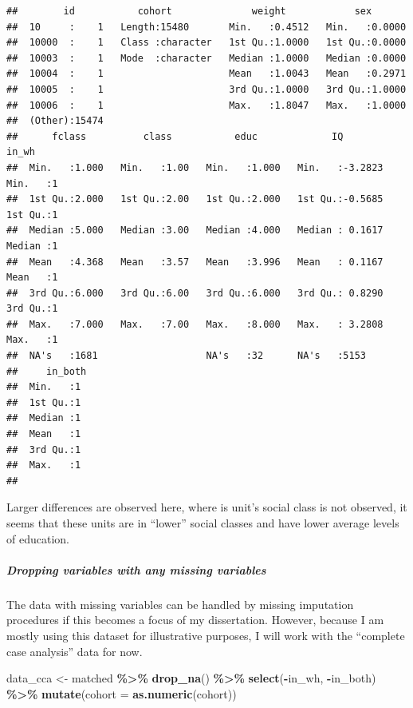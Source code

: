 \documentclass[
]{article}
\newenvironment{Shaded}{\begin{snugshade}}{\end{snugshade}}
\newcommand{\AttributeTok}[1]{\textcolor[rgb]{0.13,0.29,0.53}{#1}}
\newcommand{\FunctionTok}[1]{\textcolor[rgb]{0.13,0.29,0.53}{\textbf{#1}}}
\newcommand{\NormalTok}[1]{#1}
\newcommand{\OtherTok}[1]{\textcolor[rgb]{0.56,0.35,0.01}{#1}}
\newcommand{\SpecialCharTok}[1]{\textcolor[rgb]{0.81,0.36,0.00}{\textbf{#1}}}
\begin{document}
\begin{verbatim}
##        id           cohort              weight            sex        
##  10     :    1   Length:15480       Min.   :0.4512   Min.   :0.0000  
##  10000  :    1   Class :character   1st Qu.:1.0000   1st Qu.:0.0000  
##  10003  :    1   Mode  :character   Median :1.0000   Median :0.0000  
##  10004  :    1                      Mean   :1.0043   Mean   :0.2971  
##  10005  :    1                      3rd Qu.:1.0000   3rd Qu.:1.0000  
##  10006  :    1                      Max.   :1.8047   Max.   :1.0000  
##  (Other):15474                                                       
##      fclass          class           educ             IQ              in_wh  
##  Min.   :1.000   Min.   :1.00   Min.   :1.000   Min.   :-3.2823   Min.   :1  
##  1st Qu.:2.000   1st Qu.:2.00   1st Qu.:2.000   1st Qu.:-0.5685   1st Qu.:1  
##  Median :5.000   Median :3.00   Median :4.000   Median : 0.1617   Median :1  
##  Mean   :4.368   Mean   :3.57   Mean   :3.996   Mean   : 0.1167   Mean   :1  
##  3rd Qu.:6.000   3rd Qu.:6.00   3rd Qu.:6.000   3rd Qu.: 0.8290   3rd Qu.:1  
##  Max.   :7.000   Max.   :7.00   Max.   :8.000   Max.   : 3.2808   Max.   :1  
##  NA's   :1681                   NA's   :32      NA's   :5153                 
##     in_both 
##  Min.   :1  
##  1st Qu.:1  
##  Median :1  
##  Mean   :1  
##  3rd Qu.:1  
##  Max.   :1  
## 
\end{verbatim}

Larger differences are observed here, where is unit's social class is
not observed, it seems that these units are in ``lower'' social classes
and have lower average levels of education.

\subparagraph{Dropping variables with any missing
variables}\label{dropping-variables-with-any-missing-variables}

The data with missing variables can be handled by missing imputation
procedures if this becomes a focus of my dissertation. However, because
I am mostly using this dataset for illustrative purposes, I will work
with the ``complete case analysis'' data for now.

\begin{Shaded}
\begin{Highlighting}[]
\NormalTok{data\_cca }\OtherTok{\textless{}{-}}\NormalTok{ matched }\SpecialCharTok{\%\textgreater{}\%} 
  \FunctionTok{drop\_na}\NormalTok{() }\SpecialCharTok{\%\textgreater{}\%}
  \FunctionTok{select}\NormalTok{(}\SpecialCharTok{{-}}\NormalTok{in\_wh, }\SpecialCharTok{{-}}\NormalTok{in\_both) }\SpecialCharTok{\%\textgreater{}\%}
  \FunctionTok{mutate}\NormalTok{(}\AttributeTok{cohort =} \FunctionTok{as.numeric}\NormalTok{(cohort))}
\end{Highlighting}
\end{Shaded}
\end{document}
